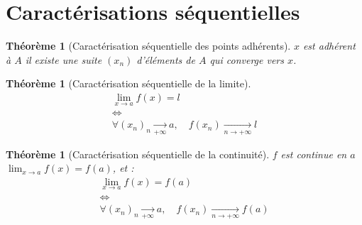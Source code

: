 \documentclass[11pt,a4paper]{report}
\newtheorem{itheorem}[theorem]{Théorème}
\theoremstyle{definition}
\begin{document}
\section{Caractérisations séquentielles} %
\label{sec:caracterisations_sequentielles}
\begin{itheorem}[Caractérisation séquentielle des points adhérents]
     $x$ est adhérent à $A$ \Longleftrightarrow il existe une suite $(x_n)$ d'éléments de $A$ qui converge vers $x$.
\end{itheorem}
\begin{itheorem}[Caractérisation séquentielle de la limite]
\[
\begin{array}{c}
     \displaystyle\lim_{x\to a} f(x) = l \\ 
     \Longleftrightarrow \\
     \forall (x_n)_n \underset{+\infty}{\longrightarrow} a,\quad f(x_n) \xrightarrow[n\to +\infty]{} l
\end{array}
\]
\end{itheorem}
\begin{itheorem}[Caractérisation séquentielle de la continuité]
     $f$ est continue en $a$ \Longleftrightarrow $\lim_{x\to a}f(x) = f(a)$, et : 
     \[
\begin{array}{c}
     \displaystyle\lim_{x\to a} f(x) = f(a) \\ 
     \Longleftrightarrow \\
     \forall (x_n)_n \underset{+\infty}{\longrightarrow} a,\quad f(x_n) \xrightarrow[n\to +\infty]{} f(a)
\end{array}
\]
\end{itheorem}

\end{document}
